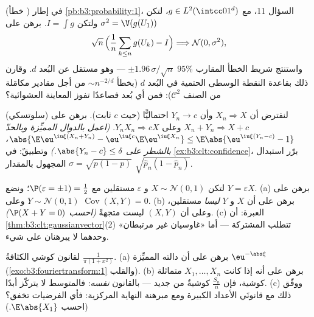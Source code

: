 \begin{exercise}[$\star\star$]\label{exo:b3:clt:7}
(خطأ ) في إطار \cref{pb:b3:probability:1}، السؤال 11، مع $g \in
L^2(\intcc01^d)$،
لتكن $\sigma^2 = \V(g(U_1))$ ولتكن $I = \int
g$. برهن على
\[
\sqrt n\,\Bigl(\frac1n\sum_{k\leq n}g(U_k) - I\Bigr)
\Longrightarrow \mathcal N(0, \sigma^2),
\]
واستنتج شريط الخطأ المقارب $95\%$ $\pm
1.96\,\sigma/\sqrt n$ --- وهو مستقل عن
البُعد $d$. وقارن ذلك بقاعدة النقطة الوسطى الحتمية في البُعد
$d$ (بخطأ $\sim n^{-2/d}$ من أجل مقادير مكامَلة من الصنف
$\mathcal C^2$): فمن أي بُعد فصاعدًا تفوز المعاينة العشوائية؟
\end{exercise}

\begin{exercise}[$\star\star\star$]\label{exo:b3:clt:8}
(سلوتسكي) لنفترض أن $X_n \Rightarrow X$ وأن $Y_n \to c$ احتماليًّا (حيث $c$
ثابت). برهن على $X_n + Y_n \Rightarrow X +
c$ وعلى $Y_nX_n \Rightarrow cX$. \emph{(اعمل بالدوال
المميِّزة وبالحدّ $\abs{\E\eu^{\iu\xi
(X_n+Y_n)} - \eu^{\iu\xi c}\E\eu^{\iu\xi X_n}} \leq
\E\abs{\eu^{\iu\xi(Y_n - c)} - 1}$، بالشطر على $\abs{Y_n - c}
\leq \delta$.)} وتطبيقٌ: في
\cref{ex:b3:clt:confidence}، برّر استبدال $\sigma = \sqrt{p(1-p)}$ المجهول بالمقدار $\sqrt{\hat p_n(1 - \hat
p_n)}$.
\end{exercise}

\begin{exercise}[$\star\star\star$]\label{exo:b3:clt:9}
لتكن $X \sim \mathcal N(0,1)$ و $\varepsilon$ مستقلين مع $\P(\varepsilon = \pm1) = \frac12$؛ ونضع $Y =
\varepsilon X$.
(a) برهن على $Y \sim \mathcal N(0,1)$ وعلى $\operatorname{Cov}(X, Y) = 0$.
(b) برهن على أن $X$ و $Y$ \emph{ليسا} مستقلين، وعلى أن
$(X, Y)$ ليست متجهةً  \emph{(احسب $\P(X + Y =
0)$)}.
(c) العبرة: أن \cref{thm:b3:clt:gaussianvector}(2) تتطلب  المشتركة ---
أما «غاوسيان غير مرتبطان» وحدهما لا يبرهنان على شيء.
\end{exercise}

\begin{exercise}[$\star\star$]\label{exo:b3:clt:10}
لقانون كوشي الكثافةُ $\frac1{\pi(1 + x^2)}$.
(a) برهن على أن دالته المميِّزة $\eu^{-\abs\xi}$ (\cref{exo:b3:fouriertransform:1}
والقلب).
(b) برهن على أنه إذا كانت $X_1, \dots, X_n$  متماثلة كوشية، فإن
$\frac{S_n}n$ كوشيةٌ من جديد --- بالقانون \emph{نفسه}: فالمتوسط
لا يتركّز أبدًا.
(c) ووفّق ذلك مع قانونَي الأعداد الكبيرة ومع مبرهنة النهاية
المركزية: فأي الفرضيات تخفق؟ (احسب $\E\abs{X_1}$.)
\end{exercise}

